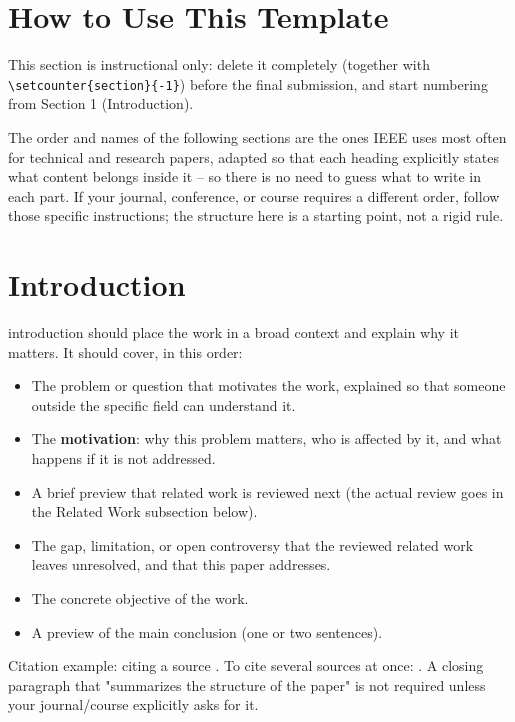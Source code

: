 \documentclass[lettersize,journal]{IEEEtran}
\begin{document}
\section{How to Use This Template}

This section is instructional only: delete it completely (together
with \texttt{\textbackslash setcounter\{section\}\{-1\}}) before the
final submission, and start numbering from Section 1 (Introduction).

The order and names of the following sections are the ones IEEE uses
most often for technical and research papers, adapted so that each
heading explicitly states what content belongs inside it -- so there
is no need to guess what to write in each part. If your journal,
conference, or course requires a different order, follow those
specific instructions; the structure here is a starting point, not a
rigid rule.

\section{Introduction}

 introduction should place the work in a broad
context and explain why it matters. It should cover, in this order:
\begin{itemize}
\item The problem or question that motivates the work, explained so
that someone outside the specific field can understand it.
\item The \textbf{motivation}: why this problem matters, who is
affected by it, and what happens if it is not addressed.
\item A brief preview that related work is reviewed next (the actual
review goes in the Related Work subsection below).
\item The gap, limitation, or open controversy that the reviewed
related work leaves unresolved, and that this paper addresses.
\item The concrete objective of the work.
\item A preview of the main conclusion (one or two sentences).
\end{itemize}
Citation example: citing a source \cite{placeholder2026}. To cite
several sources at once: \cite{placeholder2026,placeholder-conf-2026}.
A closing paragraph that "summarizes the structure of the paper" is
not required unless your journal/course explicitly asks for it.
\end{document}

